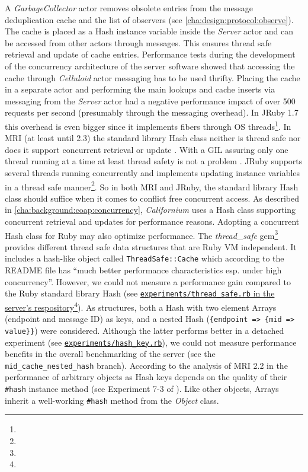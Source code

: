 		A \emph{GarbageCollector} actor removes obsolete entries from the
		message deduplication cache and the list of observers (see
		\autoref{cha:design:protocol:observe}). The cache is placed as a Hash
		instance variable inside the \emph{Server} actor and can be accessed
		from other actors through messages. This ensures thread safe retrieval
		and update of cache entries. Performance tests during the development
		of the concurrency architecture of the server software showed that
		accessing the cache through \emph{Celluloid} actor messaging has to be
		used thrifty. Placing the cache in a separate actor and performing the
		main lookups and cache inserts via messaging from the \emph{Server}
		actor had a negative performance impact of over 500 requests per second
		(presumably through the messaging overhead). In JRuby 1.7 this overhead
		is even bigger since it implements fibers through \ac{OS}
		threads\footnote{\urlJrubyFiber}. In \ac{MRI} (at least until 2.3) the
		standard library Hash class neither is thread safe nor does it support
		concurrent retrieval or update \cite{ruby-thread2}. With a \ac{GIL}
		assuring only one thread running at a time at least thread safety is
		not a problem \cite{ruby-thread1}. JRuby supports several threads
		running concurrently and implements updating instance variables in a
		thread safe manner\footnote{\urlJrubyThreadsafe}. So in both \ac{MRI}
		and JRuby, the standard library Hash class should suffice when it comes
		to conflict free concurrent access. As described in
		\autoref{cha:background:coap:concurrency}, \emph{Californium} uses a
		Hash class supporting concurrent retrieval and updates for performance
		reasons. Adopting a concurrent Hash class for Ruby may also optimize
		performance. The \emph{thread\_safe} gem\footnote{\urlGemThreadsafe}
		provides different thread safe data structures that are Ruby \ac{VM}
		independent. It includes a hash-like object called
		\texttt{ThreadSafe::Cache} which according to the README file has
		\enquote{much better performance characteristics esp. under high
		concurrency}. However, we could not measure a performance gain compared
		to the Ruby standard library Hash (see
		\href{https://github.com/nning/david/blob/master/experiments/thread\_safe.rb}{\texttt{experiments/thread\_safe.rb}
		in the server's respository}\footnote{\urlDavid}). As structures, both
		a Hash with two element Arrays (endpoint and message ID) as keys, and a
		nested Hash (\texttt{\{endpoint => \{mid => value\}\}}) were
		considered. Although the latter performs better in a detached
		experiment (see
		\href{https://github.com/nning/david/blob/master/experiments/hash\_key.rb}{\texttt{experiments/hash\_key.rb}}),
		we could not measure performance benefits in the overall benchmarking
		of the server (see the \texttt{mid\_cache\_nested\_hash} branch).
		According to the analysis of \ac{MRI} 2.2 in
		 the performance of arbitrary objects as
		Hash keys depends on the quality of their \texttt{\#hash} instance
		method (see Experiment 7-3 of \cite{ruby-microscope}). Like other
		objects, Arrays inherit a well-working \texttt{\#hash} method from the
		\emph{Object} class.

